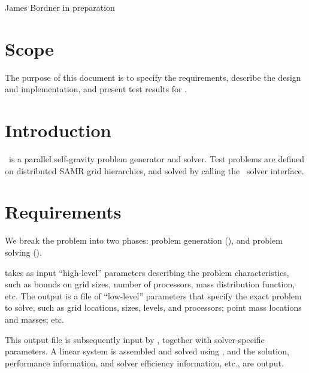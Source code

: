 \documentclass[11pt]{article}
\begin{document}
      {James Bordner}
      {in preparation}

\tableofcontents
\section{Scope}

   The purpose of this document is to specify the requirements,
   describe the design and implementation, and present test results
   for \hypregrav.

\section{Introduction}

\hypregrav\ is a parallel self-gravity problem generator and solver.
Test problems are defined on distributed SAMR grid hierarchies, and
solved by calling the  \hypre\ solver interface.

\section{Requirements} \label{s:requirements}

We break the problem into two phases: problem generation
(), and problem solving
().  

 takes as input ``high-level'' parameters
describing the problem characteristics, such as bounds on grid sizes,
number of processors, mass distribution function, etc.  The output is
a file of ``low-level'' parameters that specify the exact problem to
solve, such as grid locations, sizes, levels, and processors; point
mass locations and masses; etc.

This output file is subsequently input by , together
with solver-specific parameters.  A linear system is assembled and
solved using \hypre, and the solution, performance information, and
solver efficiency information, etc., are output.
\end{document}

